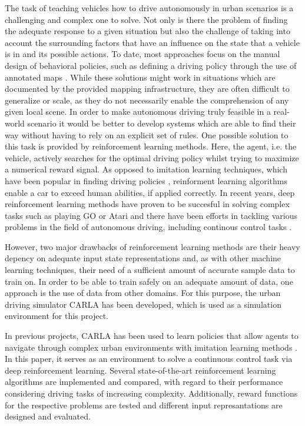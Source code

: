 \documentclass[letterpaper, 10 pt, conference]{ieeeconf}  %
\begin{document}

The task of teaching vehicles how to drive autonomously in urban scenarios is a challenging and complex one to solve. Not only is there the problem of finding the adequate response to a given situation but also the challenge of taking into account the surrounding factors that have an influence on the state that a vehicle is in and its possible actions. To date, most approaches focus on the manual design of behavioral policies, such as defining a driving policy through the use of annotated maps \cite{7339478}. While these solutions might work in situations which are documented by the provided mapping infrastructure, they are often difficult to generalize or scale, as they do not necessarily enable the comprehension of any given local scene. In order to make autonomous driving truly feasible in a real-world scenario it would be better to develop systems which are able to find their way without having to rely on an explicit set of rules. One possible solution to this task is provided by reinforcement learning methods. Here, the agent, i.e. the vehicle, actively searches for the optimal driving policy whilst trying to maximize a numerical reward signal. As opposed to imitation learning techniques, which have been popular in finding driving policies \cite{kendall2019learning}, reinforment learning algorithms enable a car to exceed human abilities, if applied correctly. In recent years, deep reinforcement learning methods have proven to be succesful in solving complex tasks such as playing GO \cite{44806} or Atari \cite{mnih2013playing} and there have been efforts in tackling various problems in the field of autonomous driving, including continous control tasks \cite{lillicrapContinuousControlDeep2015}.

However, two major drawbacks of reinforcement learning methods are their heavy depency on adequate input state representations \cite{DBLP:journals/corr/abs-1904-09503} and, as with other machine learning techniques, their need of a sufficient amount of accurate sample data to train on. In order to be able to train safely on an adequate amount of data, one approach is the use of data from other domains. For this purpose, the urban driving simulator CARLA has been developed, which is used as a simulation environment for this project.

In previous projects, CARLA has been used to learn policies that allow agents to navigate through complex urban environments with imitation learning methods \cite{DBLP:journals/corr/abs-1710-02410}\cite{DBLP:journals/corr/abs-1903-00640}. In this paper, it serves as an environment to solve a continuous control task via deep reinforcement learning. Several state-of-the-art reinforcement learning algorithms are implemented and compared, with regard to their performance considering driving tasks of increasing complexity. Additionally, reward functions for the respective problems are tested and different input represantations are designed and evaluated.
\end{document}
